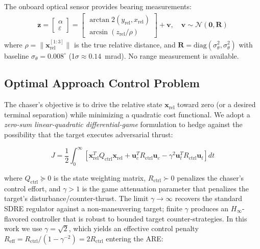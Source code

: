 \documentclass[preprint,3p,times]{elsarticle}
\begin{document}
The onboard optical sensor provides bearing measurements:
\begin{align}
\mathbf{z} = \begin{bmatrix} \alpha \\ \varepsilon \end{bmatrix} =
\begin{bmatrix}
\arctan2(y_{\text{rel}}, x_{\text{rel}}) \\
\arcsin(z_{\text{rel}} / \rho)
\end{bmatrix} + \mathbf{v}, \quad \mathbf{v} \sim \mathcal{N}(\mathbf{0}, \mathbf{R})
\end{align}
where $\rho = \|\mathbf{x}_{\text{rel}}^{[1:3]}\|$ is the true relative distance, and $\mathbf{R} = \text{diag}(\sigma_\theta^2, \sigma_\theta^2)$ with baseline $\sigma_\theta = 0.008^\circ$ (1$\sigma \approx 0.14$~mrad). No range measurement is available.

\subsection{Optimal Approach Control Problem}

The chaser's objective is to drive the relative state $\mathbf{x}_{\text{rel}}$ toward zero (or a desired terminal separation) while minimizing a quadratic cost functional. We adopt a \emph{zero-sum linear-quadratic differential-game} formulation to hedge against the possibility that the target executes adversarial thrust:

\begin{equation}
J = \frac{1}{2} \int_0^\infty \left[ \mathbf{x}_{\text{rel}}^T Q_{\text{ctrl}} \mathbf{x}_{\text{rel}} + \mathbf{u}_c^T R_{\text{ctrl}} \mathbf{u}_c - \gamma^2 \mathbf{u}_t^T R_{\text{ctrl}} \mathbf{u}_t \right] dt \label{eq:cost}
\end{equation}

where $Q_{\text{ctrl}} \succeq 0$ is the state weighting matrix, $R_{\text{ctrl}} \succ 0$ penalizes the chaser's control effort, and $\gamma > 1$ is the game attenuation parameter that penalizes the target's disturbance/counter-thrust. The limit $\gamma \to \infty$ recovers the standard SDRE regulator against a non-maneuvering target; finite $\gamma$ produces an $H_\infty$-flavored controller that is robust to bounded target counter-strategies. In this work we use $\gamma = \sqrt{2}$, which yields an effective control penalty $R_{\text{eff}} = R_{\text{ctrl}} / (1 - \gamma^{-2}) = 2 R_{\text{ctrl}}$ entering the ARE:
\end{document}
